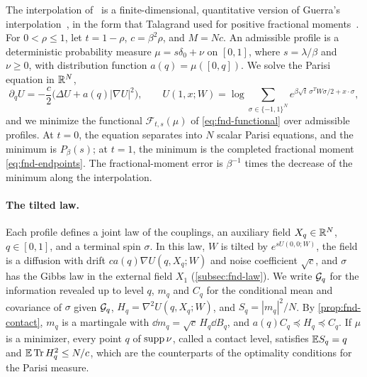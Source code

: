 The interpolation of~\cite[Section~2]{AL} is a finite-dimensional,
quantitative version of Guerra's interpolation~\cite{Guerra2003}, in the
form that Talagrand used for positive fractional
moments~\cite{Talagrand2007FractionalMoments}. For $0<\rho\le1$, let
$t=1-\rho$, $c=\beta^2\rho$, and $M=Nc$. An admissible profile is a
deterministic probability measure $\mu=s\delta_0+\nu$ on $[0,1]$, where
$s=\lambda/\beta$ and $\nu\ge0$, with distribution function
$a(q)=\mu([0,q])$. We solve the Parisi equation in $\mathbb R^N$,
\[
 \partial_qU=-\frac c2\bigl(\Delta U+a(q)|\nabla U|^2\bigr),\qquad
 U(1,x;W)=\log\sum_{\sigma\in\{-1,1\}^N}
 e^{\beta\sqrt t\,\sigma^TW\sigma/2+x\cdot\sigma},
\]
and we minimize the functional $\mathcal F_{t,s}(\mu)$ of
\eqref{eq:fnd-functional} over admissible profiles. At $t=0$, the
equation separates into $N$ scalar Parisi equations, and the minimum is
$P_\beta(s)$; at $t=1$, the minimum is the completed fractional moment
\eqref{eq:fnd-endpoints}. The fractional-moment error is
$\beta^{-1}$ times the decrease of the minimum along the interpolation.

\paragraph{The tilted law.}
Each profile defines a joint law of the couplings, an auxiliary field
$X_q\in\mathbb R^N$, $q\in[0,1]$, and a terminal spin $\sigma$. In this law, $W$ is
tilted by $e^{sU(0,0;W)}$, the field is a diffusion with drift
$ca(q)\nabla U(q,X_q;W)$ and noise coefficient $\sqrt c$, and $\sigma$ has
the Gibbs law in the external field $X_1$ (\cref{subsec:fnd-law}). We write $\mathcal G_q$ for the
information revealed up to level $q$, $m_q$ and $C_q$ for the
conditional mean and covariance of $\sigma$ given $\mathcal G_q$,
$H_q=\nabla^2U(q,X_q;W)$, and $S_q=|m_q|^2/N$. By
\cref{prop:fnd-contact}, $m_q$ is a martingale with
$\dd m_q=\sqrt c\,H_q\dd B_q$, and $a(q)C_q\preceq H_q\preceq C_q$. If
$\mu$ is a minimizer, every point $q$ of $\operatorname{supp}\nu$, called a contact
level, satisfies $\mathbb E S_q=q$ and $\mathbb E\operatorname{Tr} H_q^2\le N/c$, which are the
counterparts of the optimality conditions for the Parisi measure.

